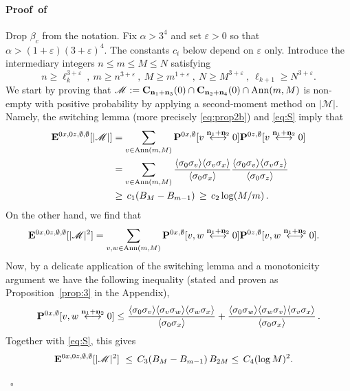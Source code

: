 \documentclass[a4paper,oneside,11pt]{article}
\newcommand{\be}[1]{\begin{equation}\label{#1}}
\newcommand{\ee}{\end{equation}}
\numberwithin{equation}{section}
\numberwithin{equation}{section}
\numberwithin{equation}{section}
\newenvironment{proof}[1][\relax]%
  {\paragraph{Proof\ifx#1\relax\else~of #1\fi}}%
  {~\hfill$\square$\par\bigskip}
\newcommand{\calM}{\mathcal{M}}
\def\be{\begin{equation}}
\def\ee{\end{equation}}
\newcommand{\ep}{\varepsilon}
\newcommand{\n}{\mathbf{n}}
\begin{document}
\begin{proof}Drop $\beta_c$ from the notation. 
Fix $\alpha>3^4$ and set $\ep>0$ so that $\alpha>(1+\ep)(3+\ep)^4$. The constants $c_i$ below depend on $\ep$ only. Introduce the intermediary integers $n\le m\le M\le N$ satisfying 
\be 
n\ge \ell_{k}^{3+\ep}\ ,\  m\ge n^{3+\ep}\ ,\  M\ge m^{1+\ep}\ ,\  N\ge M^{3+\ep}\ ,\ \ell_{k+1}\ge N^{3+\ep}.
\ee
 We start by proving that 
 $\calM:={\bf C}_{\n_1+\n_3}(0)\cap {\bf C}_{\n_2+\n_4}(0)\cap {\rm Ann}(m,M)$
  is non-empty with positive probability by applying a second-moment method on $|\calM|$. Namely, the switching lemma (more precisely \eqref{eq:prop2b}) and \eqref{eq:S} imply   that 
\begin{align}{\bf E}^{0x,0z,\emptyset,\emptyset}[|\calM|] &=\sum_{v\in {\rm Ann}(m,M)}{\bf P}^{0x,\emptyset}[v\stackrel{\n_1+\n_2}\longleftrightarrow 0]{\bf P}^{0z,\emptyset}[v\stackrel{\n_1+\n_2}\longleftrightarrow 0]\nonumber\\
&=\sum_{v\in {\rm Ann}(m,M)}\frac{\langle\sigma_0\sigma_v\rangle\langle\sigma_v\sigma_x\rangle}{\langle\sigma_0\sigma_x\rangle}\frac{\langle\sigma_0\sigma_v\rangle\langle\sigma_v\sigma_z\rangle}{\langle\sigma_0\sigma_z\rangle}\nonumber\\ 
&\geq  \, c_1 (B_M-B_{m-1}) \, \geq  \, c_2 \log (M/m)\, .\end{align} 
On the other hand, we find that 
\begin{align}
{\bf E}^{0x,0z,\emptyset,\emptyset}[|\calM|^2]&=\sum_{v,w\in {\rm Ann}(m,M)}{\bf P}^{0x,\emptyset}[v,w\stackrel{\n_1+\n_2}\longleftrightarrow 0]{\bf P}^{0z,\emptyset}[v,w\stackrel{\n_1+\n_2}\longleftrightarrow 0].
\end{align}
Now, by a delicate application of the switching lemma and a monotonicity argument   we have  the following inequality (stated and proven as  
 Proposition~\ref{prop:3}  in the Appendix),
 \begin{equation}
{\bf P}^{0x,\emptyset}[v,w\stackrel{\n_1+\n_2}\longleftrightarrow 0]\le \frac{\langle\sigma_0\sigma_v\rangle\langle\sigma_v\sigma_w\rangle\langle\sigma_w\sigma_x\rangle}{\langle\sigma_0\sigma_x\rangle}+\frac{\langle\sigma_0\sigma_w\rangle\langle\sigma_w\sigma_v\rangle\langle\sigma_v\sigma_x\rangle}{\langle\sigma_0\sigma_x\rangle}\,. 
\end{equation}
Together with \eqref{eq:S}, this gives 
\begin{align} 
{\bf E}^{0x,0z,\emptyset,\emptyset}[|\calM|^2] 
\ \leq \, C_3 (B_M-B_{m-1}) \, B_{2M} & \leq \,  C_4 (\log M)^2.\end{align}

\end{proof}
\end{document}
